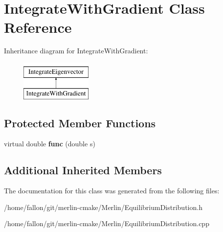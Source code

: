\hypertarget{classIntegrateWithGradient}{}\section{Integrate\+With\+Gradient Class Reference}
\label{classIntegrateWithGradient}
Inheritance diagram for Integrate\+With\+Gradient\+:\begin{figure}[H]
\begin{center}
\leavevmode
\includegraphics[height=2.000000cm]{classIntegrateWithGradient}
\end{center}
\end{figure}
\subsection*{Protected Member Functions}
\begin{DoxyCompactItemize}
\item 
\mbox{\label{classIntegrateWithGradient_a1290702bacf95efd33ca0368ce016861}} 
virtual double {\bfseries func} (double s)
\end{DoxyCompactItemize}
\subsection*{Additional Inherited Members}


The documentation for this class was generated from the following files\+:\begin{DoxyCompactItemize}
\item 
/home/fallon/git/merlin-\/cmake/\+Merlin/Equilibrium\+Distribution.\+h\item 
/home/fallon/git/merlin-\/cmake/\+Merlin/Equilibrium\+Distribution.\+cpp\end{DoxyCompactItemize}
